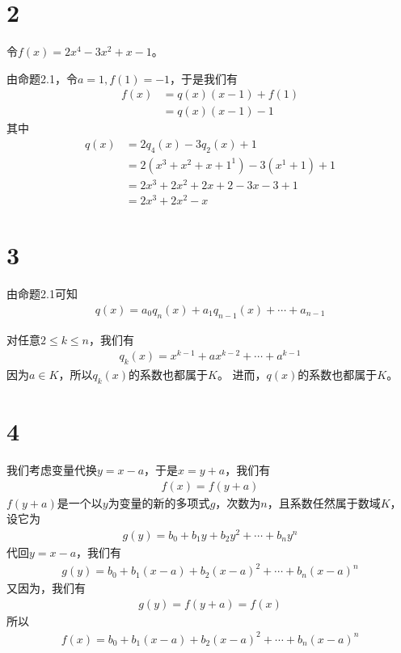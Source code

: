 \documentclass{article}
\begin{document}
\section*{2}

令$f(x) = 2x^4 - 3x^2 + x - 1$。

由命题2.1，令$a = 1, f(1) = -1$，于是我们有
\begin{align*}
  f(x) & = q(x)(x - 1) + f(1) \\
       & = q(x)(x - 1) - 1
\end{align*}
其中
\begin{align*}
  q(x) & = 2 q_4(x) - 3 q_2(x) + 1                 \\
       & = 2(x^3 + x^2 + x + 1^1) - 3(x^1 + 1) + 1 \\
       & = 2x^3 + 2x^2 + 2x + 2 - 3x - 3 + 1       \\
       & = 2x^3 + 2x^2 - x
\end{align*}

\section*{3}

由命题2.1可知
\begin{align*}
  q(x) = a_0q_n(x) + a_1q_{n-1}(x) + \cdots + a_{n - 1}
\end{align*}

对任意$2 \leq k \leq n$，我们有
\begin{align*}
  q_k(x) = x^{k - 1} + ax^{k - 2} + \cdots + a^{k - 1}
\end{align*}
因为$a \in K$，所以$q_k(x)$的系数也都属于$K$。
进而，$q(x)$的系数也都属于$K$。

\section*{4}

我们考虑变量代换$y = x - a$，于是$x = y + a$，我们有
\begin{align*}
  f(x) = f(y + a)
\end{align*}
$f(y + a)$是一个以$y$为变量的新的多项式$g$，次数为$n$，且系数任然属于数域$K$，
设它为
\begin{align*}
  g(y) = b_0 + b_1 y + b_2 y^2 + \cdots + b_{n} y^{n}
\end{align*}
代回$y = x - a$，我们有
\begin{align*}
  g(y) = b_0 + b_1 (x - a) + b_2 (x - a)^2 + \cdots + b_{n} (x - a)^n
\end{align*}
又因为，我们有
\begin{align*}
  g(y) = f(y + a) = f(x)
\end{align*}
所以
\begin{align*}
  f(x) = b_0 + b_1 (x - a) + b_2 (x - a)^2 + \cdots + b_{n} (x - a)^n
\end{align*}
\end{document}
